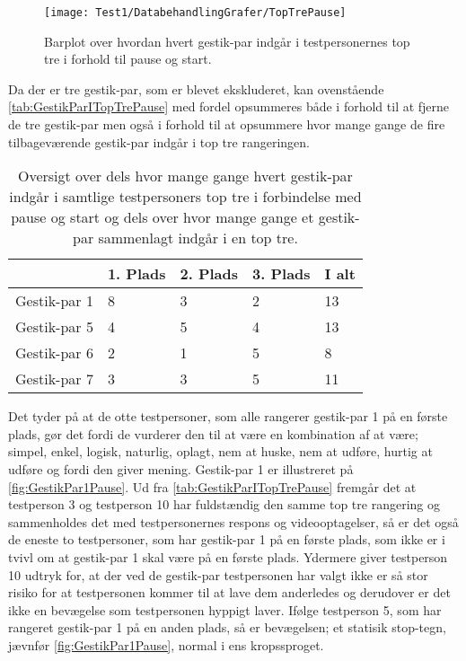%
\begin{figure}[H]
	\centering
	\texttt{[image: Test1/DatabehandlingGrafer/TopTrePause]}
	\caption{Barplot over hvordan hvert gestik-par indgår i testpersonernes top tre i forhold til pause og start.}
	\label{fig:SamletTopTrePause}
\end{figure}
\noindent
%
Da der er tre gestik-par, som er blevet ekskluderet, kan ovenstående  \autoref{tab:GestikParITopTrePause} med fordel opsummeres både i forhold til at fjerne de tre gestik-par men også i forhold til at opsummere hvor mange gange de fire tilbageværende gestik-par indgår i top tre rangeringen. 
%
\begin{table}[H]
	\centering
	\begin{tabular}{ | p{2.4cm} | p{2.4cm} | p{2.4cm} | p{2.4cm} |p{2.4cm}|}
	\hline
		 & 1. Plads & 2. Plads & 3. Plads & I alt \\ \hline
		Gestik-par 1 & 8 & 3 & 2 & 13\\ \hline
		Gestik-par 5 & 4 & 5 & 4 & 13\\ \hline
		Gestik-par 6 & 2 & 1 & 5 & 8\\ \hline 
		Gestik-par 7 & 3 & 3 & 5 & 11\\ \hline
	\end{tabular}
	\caption{Oversigt over dels hvor mange gange hvert gestik-par indgår i samtlige testpersoners top tre i forbindelse med pause og start og dels over hvor mange gange et gestik-par sammenlagt indgår i en top tre.}
	\label{tab:GestikParITopTrePauseOversigt}
\end{table}
\noindent
%
Det tyder på at de otte testpersoner, som alle rangerer gestik-par 1 på en første plads, gør det fordi de vurderer den til at være en kombination af at være; simpel, enkel, logisk, naturlig, oplagt, nem at huske, nem at udføre, hurtig at udføre og fordi den giver mening. Gestik-par 1 er illustreret på \autoref{fig:GestikPar1Pause}. Ud fra \autoref{tab:GestikParITopTrePause} fremgår det at testperson 3 og testperson 10 har fuldstændig den samme top tre rangering og sammenholdes det med testpersonernes respons og videooptagelser, så er det også de eneste to testpersoner, som har gestik-par 1 på en første plads, som ikke er i tvivl om at gestik-par 1 skal være på en første plads. Ydermere giver testperson 10 udtryk for, at der ved de gestik-par testpersonen har valgt ikke er så stor risiko for at testpersonen kommer til at lave dem anderledes og derudover er det ikke en bevægelse som testpersonen hyppigt laver. Ifølge testperson 5, som har rangeret gestik-par 1 på en anden plads, så er bevægelsen; et statisik stop-tegn, jævnfør \autoref{fig:GestikPar1Pause}, normal i ens kropssproget.   

